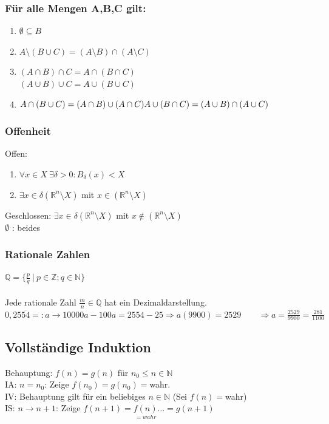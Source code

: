\documentclass[6pt,a4paper]{scrartcl}
\newcommand{\N}{\ensuremath{\mathbb N}}
\newcommand{\R}{\ensuremath{\mathbb R}}
\begin{document}
\begin{multicols}{4}
\subsubsection{Für alle Mengen A,B,C gilt:}
\begin{enumerate}\itemsep-1pt
\item $\emptyset \subseteq B $
\item $A \setminus (B \cup C) = (A \setminus B) \cap (A \setminus C)$
\item $(A \cap B) \cap C = A \cap (B \cap C)$\\
	$(A \cup B) \cup C = A \cup (B \cup C)$
\item $A \cap (B \cup C) = (A \cap B) \cup (A \cap C) \\
	A \cup (B \cap C) = (A \cup B) \cap (A \cup C)$
\end{enumerate}

\subsubsection{Offenheit}
Offen: \begin{enumerate}\itemsep-1pt
\item $\forall x \in X ~ \exists \delta > 0 : B_\delta(x)<X$
\item $\exists x \in \delta (\R^n\setminus X)$ mit $x \in (\R^n\setminus X)$
\end{enumerate}
Geschlossen: $\exists x \in \delta (\R^n\setminus X)$ mit $x \notin (\R^n\setminus X)$ \\
$\emptyset$ : beides \\

\subsubsection{Rationale Zahlen}
$\mathbb Q=\{\frac{p}{q}\ \vert\ p\in\mathbb Z; q\in\N\}$\\
\\
Jede rationale Zahl $\frac m n \in \mathbb Q$ hat ein Dezimaldarstellung.\\
$0,25\overline{54} =: a \rightarrow 10000a - 100a = 2554 -25 \Rightarrow a(9900) = 2529 \qquad \Rightarrow a = \frac{2529}{9900} = \frac{281}{1100}$

\subsection{Vollständige Induktion}
Behauptung: $f(n)=g(n)$ für $n_0 \le n \in \N$\\ 
IA: $n=n_0$: \quad Zeige $f(n_0)=g(n_0)=$wahr.\\
IV: Behauptung gilt für ein beliebiges $n\in\N$ \quad (Sei $f(n)=$wahr)\\
IS: $n \rightarrow n+1$: \quad Zeige $f(n+1)=\underset{=wahr}{f(n)}  \dotsc=g(n+1)$


\end{multicols}
\end{document}

